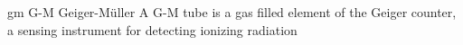 \newglsXacronym%
{gm}%
{G{\--}M}%
{Geiger{\--}M\"{u}ller}%
{A G{\--}M tube is a gas filled element of the Geiger counter, a sensing instrument for detecting ionizing radiation}%